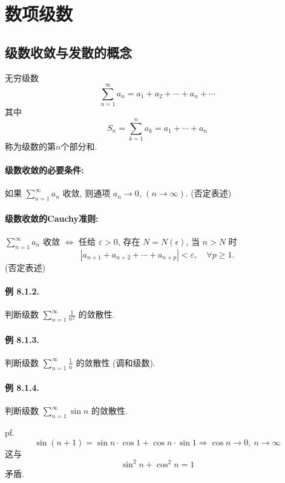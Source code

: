 
\section{数项级数}

\subsection{级数收敛与发散的概念}

无穷级数
\[
\sum_{n=1}^{\infty}a_{n}=a_{1}+a_{2}+\cdots+a_{n}+\cdots
\]
其中
\[
S_{n}=\sum_{k=1}^{n}a_{k}=a_{1}+\cdots+a_{n}
\]
称为级数的第$n$个部分和.

\paragraph{级数收敛的必要条件:}

如果 $\sum_{n=1}^{\infty}a_{n}$ 收敛, 则通项 $a_{n}\rightarrow0$, $(n\rightarrow\infty)$.
(否定表述)

\paragraph{级数收敛的Cauchy准则:}

$\sum_{n=1}^{\infty}a_{n}$ 收敛 $\Longleftrightarrow$ 任给 $\varepsilon>0$,
存在 $N=N(\epsilon)$, 当 $n>N$ 时 
\[
\left|a_{n+1}+a_{n+2}+\cdots+a_{n+p}\right|<\varepsilon,\quad\forall p\geqslant1.
\]
(否定表述)

\paragraph{例 8.1.2. }

判断级数 $\sum_{n=1}^{\infty}\frac{1}{n^{2}}$ 的敛散性.

\paragraph{例 8.1.3. }

判断级数 $\sum_{n=1}^{\infty}\frac{1}{n}$ 的敛散性 (调和级数).

\paragraph{例 8.1.4. }

判断级数 $\sum_{n=1}^{\infty}\sin n$ 的敛散性.

pf. 
\[
\sin(n+1)=\sin n\cdot\cos1+\cos n\cdot\sin1\Longrightarrow\cos n\to0,\ n\to\infty
\]
这与
\[
\sin^{2}n+\cos^{2}n=1
\]
矛盾.

